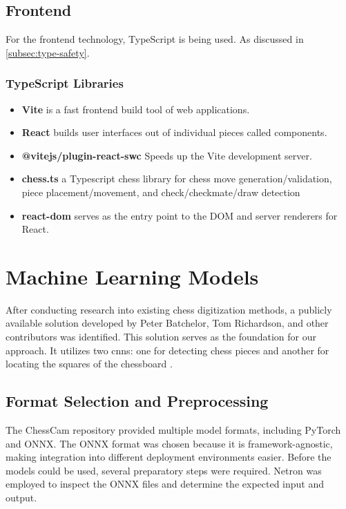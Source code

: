 \subsection{Frontend}

For the frontend technology, TypeScript is being used. As discussed in \ref{subsec:type-safety}.

\subsubsection*{TypeScript Libraries}

\begin{itemize}
    \item \textbf{Vite} is a fast frontend build tool of web applications. \cite{ts:vite}
    
    \item \textbf{React} builds user interfaces out of individual pieces called components. \cite{ts:react}
    
    \item \textbf{@vitejs/plugin-react-swc} Speeds up the Vite development server. \cite{ts:swc}
    
    \item \textbf{chess.ts} a Typescript chess library for chess move generation/validation, piece placement/movement, and check/checkmate/draw detection \cite{ts:chess}
    
    \item \textbf{react-dom} serves as the entry point to the DOM and server renderers for React. \cite{ts:react-dom}
\end{itemize}


\section{Machine Learning Models}
\label{sec:ml-models}

After conducting research into existing chess digitization methods, a publicly available solution developed by Peter Batchelor, Tom Richardson, and other contributors was identified. This solution serves as the foundation for our approach. It utilizes two \glspl{cnn}: one for detecting chess pieces and another for locating the squares of the chessboard \cite{lichess:chesscam}.

\subsection*{Format Selection and Preprocessing}
The ChessCam repository provided multiple model formats, including PyTorch and ONNX. The ONNX format was chosen because it is framework-agnostic, making integration into different deployment environments easier. Before the models could be used, several preparatory steps were required. Netron was employed to inspect the ONNX files and determine the expected input and output. \\

